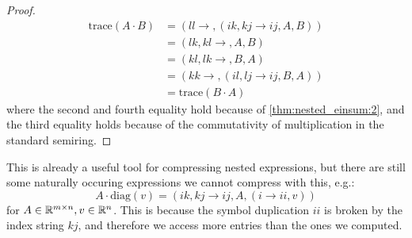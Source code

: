 \begin{proof}
    \small
    \begin{align*}
        \text{trace}(A \cdot B) & = (ll \rightarrow , (ik,kj \rightarrow ij, A, B))  \\
                                & = (lk, kl \rightarrow ,A, B)                       \\
                                & = (kl, lk \rightarrow ,B, A)                       \\
                                & = (kk \rightarrow , (il, lj \rightarrow ij, B, A)) \\
                                & = \text{trace}(B \cdot A)
    \end{align*}
    where the second and fourth equality hold because of \autoref{thm:nested_einsum:2},
    and the third equality holds because of the commutativity of multiplication in the standard semiring.
\end{proof}
\bigskip

This is already a useful tool for compressing nested expressions, but there are still some naturally occuring expressions we cannot compress with this,
e.g.:
$$A \cdot \text{diag}(v) = (ik, kj \rightarrow ij, A, (i \rightarrow ii, v))$$
for $A \in \mathbb{R}^{m \times n}, v \in \mathbb{R}^{n}$.
This is because the symbol duplication $ii$ is broken by the index string $kj$, and therefore we access more entries than the ones we computed.



